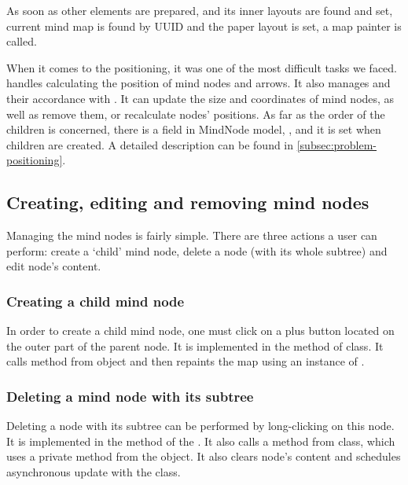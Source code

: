 As soon as other elements are prepared,  and its inner  layouts are found and set, current mind map is found by UUID and the paper layout is set, a map painter is called.

When it comes to the positioning, it was one of the most difficult tasks we faced.  handles calculating the position of mind nodes and arrows. It also manages  and their accordance with . It can update the size and coordinates of mind nodes, as well as remove them, or recalculate nodes' positions. As far as the order of the children is concerned, there is a field in MindNode model, , and it is set when children are created. A detailed description can be found in \cref{subsec:problem-positioning}.

\subsection{Creating, editing and removing mind nodes}
\label{subsec:drawing}
Managing the mind nodes is fairly simple. There are three actions a user can perform: create a `child' mind node, delete a node (with its whole subtree) and edit node's content. 

\subsubsection{Creating a child mind node}
\label{subsubsec:create-child}
In order to create a child mind node, one must click on a plus button located on the outer part of the parent node. It is implemented in the  method of  class. It calls  method from  object and then repaints the map using an instance of .

\subsubsection{Deleting a mind node with its subtree}
\label{subsubsec:delete-node}

Deleting a node with its subtree can be performed by long-clicking on this node. It is implemented in the  method of the . It also calls a  method from  class, which uses  a private method from the  object. It also clears node's content and schedules asynchronous update with the  class.
 
